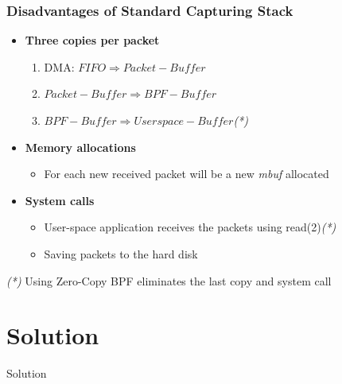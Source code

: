 \documentclass{beamer}
\begin{document}
\begin{frame}
\frametitle{Disadvantages of Standard Capturing Stack}
\begin{itemize}
	\item \textbf{Three copies per packet}
		\begin{enumerate}
			\item DMA: $FIFO \Rightarrow Packet-Buffer$
			\item $Packet-Buffer \Rightarrow BPF-Buffer$
			\item $BPF-Buffer \Rightarrow Userspace-Buffer$\emph{(*)}
		\end{enumerate}
	\item \textbf{Memory allocations }
		\begin{itemize}
			\item For each new received packet will be a new \emph{mbuf} 
				allocated
		\end{itemize}
	\item \textbf{System calls }
		\begin{itemize}
			\item User-space application receives the packets using read(2)\emph{(*)}
			\item Saving packets to the hard disk
		\end{itemize}
\end{itemize}
\begin{tiny}
\emph{(*)} Using Zero-Copy BPF eliminates the last copy and system call
\end{tiny}
\end{frame}

\section{Solution}

\begin{frame}
	\begin{center}
	\huge{Solution}
	\end{center}
\end{frame}
\end{document}
